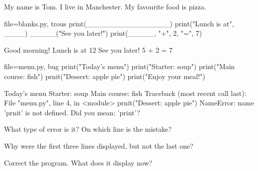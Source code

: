 \begin{questions}[2]
\item {}
\item {}
\item {}
\item {}
\item {}
\item {}
\end{questions}

\begin{sortie}
My name is Tom.
I live in Manchester.
My favourite food is pizza.
\end{sortie}

\begin{code}{file=blanks.py, trous}
print(________________)
print("Lunch is at", ____)
_____("See you later!")
print(_____, "+", 2, "=", 7)
\end{code}
\begin{sortie}
Good morning!
Lunch is at 12
See you later!
5 + 2 = 7
\end{sortie}

\begin{code}{file=menu.py, bug}
print("Today's menu")
print("Starter: soup")
print("Main course: fish")
prnit("Dessert: apple pie")
print("Enjoy your meal!")
\end{code}
\begin{erreur}
Today's menu
Starter: soup
Main course: fish
Traceback (most recent call last):
  File "menu.py", line 4, in <module>
    prnit("Dessert: apple pie")
NameError: name 'prnit' is not defined. Did you mean: 'print'?
\end{erreur}
\begin{questions}
\item What type of error is it? On which line is the mistake?
\item Why were the first three lines displayed, but not the last one?
\item Correct the program. What does it display now?
\end{questions}

